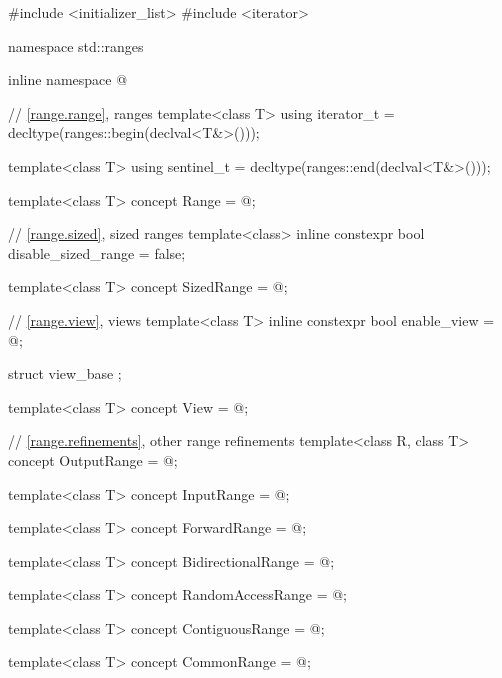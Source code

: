 %
\begin{codeblock}
#include <initializer_list>
#include <iterator>

namespace std::ranges {
  inline namespace @

  // \ref{range.range}, ranges
  template<class T>
    using iterator_t = decltype(ranges::begin(declval<T&>()));

  template<class T>
    using sentinel_t = decltype(ranges::end(declval<T&>()));

  template<class T>
    concept Range = @\seebelow@;

  // \ref{range.sized}, sized ranges
  template<class>
    inline constexpr bool disable_sized_range = false;

  template<class T>
    concept SizedRange = @\seebelow@;

  // \ref{range.view}, views
  template<class T>
    inline constexpr bool enable_view = @\seebelow@;

  struct view_base { };

  template<class T>
    concept View = @\seebelow@;

  // \ref{range.refinements}, other range refinements
  template<class R, class T>
    concept OutputRange = @\seebelow@;

  template<class T>
    concept InputRange = @\seebelow@;

  template<class T>
    concept ForwardRange = @\seebelow@;

  template<class T>
    concept BidirectionalRange = @\seebelow@;

  template<class T>
    concept RandomAccessRange = @\seebelow@;

  template<class T>
    concept ContiguousRange = @\seebelow@;

  template<class T>
    concept CommonRange = @\seebelow@;

}
\end{codeblock}
